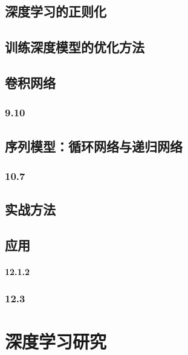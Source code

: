 \documentclass[a4paper,11pt]{book}
\begin{document}
\chapter{深度学习的正则化}
\label{chap:7}

\chapter{训练深度模型的优化方法}
\label{chap:8}

\chapter{卷积网络}
\label{chap:9}


\section{9.10}
\label{sec:9.10}

\chapter{序列模型：循环网络与递归网络}
\label{chap:10}

\section{10.7}
\label{sec:10.7}

\chapter{实战方法}
\label{chap:11}

\chapter{应用}
\label{chap:12}


\subsection{12.1.2}
\label{sec:12.1.2}

\section{12.3}
\label{sec:12.3}

\part{深度学习研究}
\label{part:3}
\end{document}
